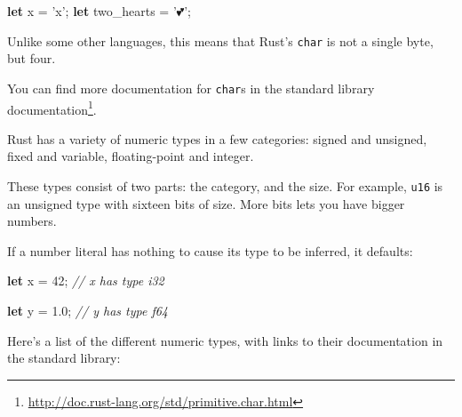 \documentclass[a4paper,]{book}
\newenvironment{Shaded}{\begin{snugshade}}{\end{snugshade}}
\newcommand{\KeywordTok}[1]{\textcolor[rgb]{0.13,0.29,0.53}{\textbf{{#1}}}}
\newcommand{\DecValTok}[1]{\textcolor[rgb]{0.00,0.00,0.81}{{#1}}}
\newcommand{\CharTok}[1]{\textcolor[rgb]{0.31,0.60,0.02}{{#1}}}
\newcommand{\CommentTok}[1]{\textcolor[rgb]{0.56,0.35,0.01}{\textit{{#1}}}}
\newcommand{\NormalTok}[1]{{#1}}
\renewcommand{\href}[2]{#2\footnote{\url{#1}}}
\begin{document}
\begin{Shaded}
\begin{Highlighting}[]
\KeywordTok{let} \NormalTok{x = }\CharTok{'x'}\NormalTok{;}
\KeywordTok{let} \NormalTok{two_hearts = }\CharTok{'💕'}\NormalTok{;}
\end{Highlighting}
\end{Shaded}

Unlike some other languages, this means that Rust's \texttt{char} is not
a single byte, but four.

You can find more documentation for \texttt{char}s
\href{http://doc.rust-lang.org/std/primitive.char.html}{in the standard
library documentation}.


Rust has a variety of numeric types in a few categories: signed and
unsigned, fixed and variable, floating-point and integer.

These types consist of two parts: the category, and the size. For
example, \texttt{u16} is an unsigned type with sixteen bits of size.
More bits lets you have bigger numbers.

If a number literal has nothing to cause its type to be inferred, it
defaults:

\begin{Shaded}
\begin{Highlighting}[]
\KeywordTok{let} \NormalTok{x = }\DecValTok{42}\NormalTok{; }\CommentTok{// x has type i32}

\KeywordTok{let} \NormalTok{y = }\DecValTok{1.0}\NormalTok{; }\CommentTok{// y has type f64}
\end{Highlighting}
\end{Shaded}

Here's a list of the different numeric types, with links to their
documentation in the standard library:
\end{document}

